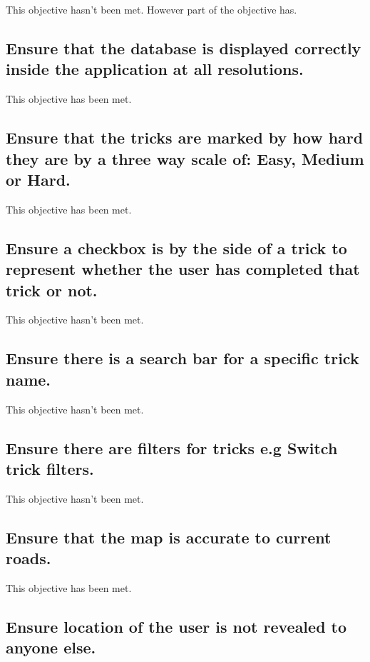 This objective hasn't been met. However part of the objective has.

\subsection {Ensure that the database is displayed correctly inside the application at all resolutions.}

This objective has been met.

\subsection {Ensure that the tricks are marked by how hard they are by a three way scale of: Easy, Medium or Hard.}

This objective has been met.

\subsection {Ensure a checkbox is by the side of a trick to represent whether the user has completed that trick or not.}

This objective hasn't been met.

\subsection {Ensure there is a search bar for a specific trick name.}

This objective hasn't been met.

\subsection {Ensure there are filters for tricks e.g Switch trick filters.}

This objective hasn't been met.



\subsection {Ensure that the map is accurate to current roads.}

This objective has been met.

\subsection {Ensure location of the user is not revealed to anyone else.}

